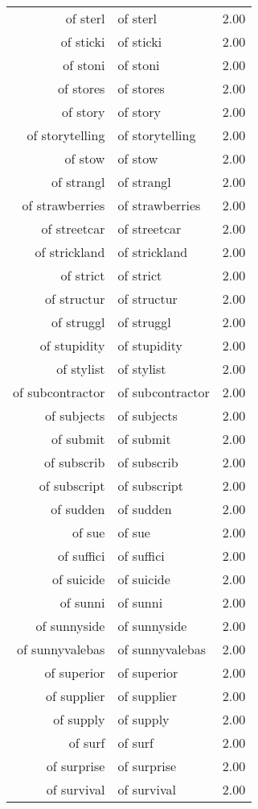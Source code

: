 \begin{table}[ht]
\begin{tabular}{rlr}
  of sterl & of sterl & 2.00 \\ 
  of sticki & of sticki & 2.00 \\ 
  of stoni & of stoni & 2.00 \\ 
  of stores & of stores & 2.00 \\ 
  of story & of story & 2.00 \\ 
  of storytelling & of storytelling & 2.00 \\ 
  of stow & of stow & 2.00 \\ 
  of strangl & of strangl & 2.00 \\ 
  of strawberries & of strawberries & 2.00 \\ 
  of streetcar & of streetcar & 2.00 \\ 
  of strickland & of strickland & 2.00 \\ 
  of strict & of strict & 2.00 \\ 
  of structur & of structur & 2.00 \\ 
  of struggl & of struggl & 2.00 \\ 
  of stupidity & of stupidity & 2.00 \\ 
  of stylist & of stylist & 2.00 \\ 
  of subcontractor & of subcontractor & 2.00 \\ 
  of subjects & of subjects & 2.00 \\ 
  of submit & of submit & 2.00 \\ 
  of subscrib & of subscrib & 2.00 \\ 
  of subscript & of subscript & 2.00 \\ 
  of sudden & of sudden & 2.00 \\ 
  of sue & of sue & 2.00 \\ 
  of suffici & of suffici & 2.00 \\ 
  of suicide & of suicide & 2.00 \\ 
  of sunni & of sunni & 2.00 \\ 
  of sunnyside & of sunnyside & 2.00 \\ 
  of sunnyvalebas & of sunnyvalebas & 2.00 \\ 
  of superior & of superior & 2.00 \\ 
  of supplier & of supplier & 2.00 \\ 
  of supply & of supply & 2.00 \\ 
  of surf & of surf & 2.00 \\ 
  of surprise & of surprise & 2.00 \\ 
  of survival & of survival & 2.00 \\ 

\end{tabular}
\end{table}
